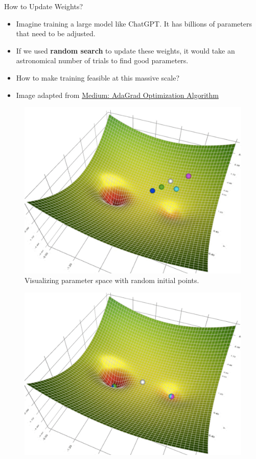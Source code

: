 \documentclass[serif, aspectratio=169]{beamer}
\begin{document}
\begin{frame}{How to Update Weights?}
    \begin{itemize}
        \item Imagine training a large model like ChatGPT. It has billions of parameters that need to be adjusted.
        \item If we used \textbf{random search} to update these weights, it would take an astronomical number of trials to find good parameters.
        \item How to make training feasible at this massive scale?
        \item Image adapted from \href{https://medium.com/@brijesh_soni/understanding-the-adagrad-optimization-algorithm-an-adaptive-learning-rate-approach-9dfaae2077bb}{Medium: AdaGrad Optimization Algorithm}
    \end{itemize}
    \begin{figure}[!htb]
  \begin{minipage}{0.3\textwidth}
     \centering
     \includegraphics[width=.9\linewidth]{pic/gd1.png}\\
            {\scriptsize Visualizing parameter space with random initial points.}
  \end{minipage}\hfill
    \begin{minipage}{0.3\textwidth}
     \centering
     \includegraphics[width=.9\linewidth]{pic/gd2.png}\\

\end{minipage}
\end{figure}
\end{frame}
\end{document}
